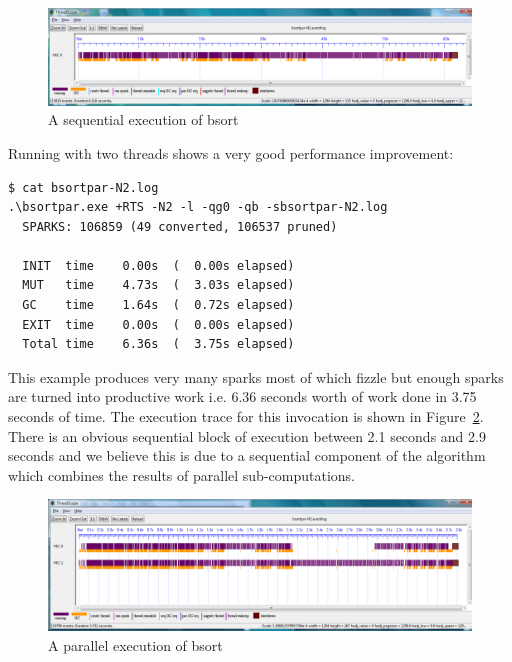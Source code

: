 \begin{figure}
\begin{center}
\includegraphics[scale=0.3]{bsortpar-n1.png}
\end{center}
\caption{A sequential execution of bsort}
\label{f:bsortpar-n1}
\end{figure}

Running with two threads shows a very good performance improvement:

\begin{verbatim}
$ cat bsortpar-N2.log
.\bsortpar.exe +RTS -N2 -l -qg0 -qb -sbsortpar-N2.log
  SPARKS: 106859 (49 converted, 106537 pruned)

  INIT  time    0.00s  (  0.00s elapsed)
  MUT   time    4.73s  (  3.03s elapsed)
  GC    time    1.64s  (  0.72s elapsed)
  EXIT  time    0.00s  (  0.00s elapsed)
  Total time    6.36s  (  3.75s elapsed)
\end{verbatim}

This example produces very many sparks most of which fizzle but enough sparks are turned into productive work i.e. 6.36 seconds worth of work done in 3.75 seconds of time. The execution trace for this invocation is shown in Figure~\ref{f:bsortpar-n2}. There is an obvious sequential block of execution between 2.1 seconds and 2.9 seconds and we believe this is due to a sequential component of the algorithm which combines the results of parallel sub-computations.

\begin{figure}
\begin{center}
\includegraphics[scale=0.3]{bsortpar-n2.png}
\end{center}
\caption{A parallel execution of bsort}
\label{f:bsortpar-n2}
\end{figure}

